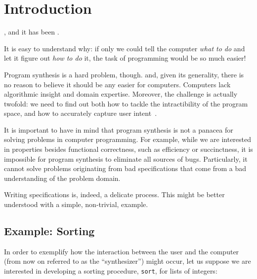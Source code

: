 \chapter{Introduction}
\label{chapter:introduction}

 , and it has been
.

It is easy to understand why: if only we could tell the computer \textit{what to
do} and let it figure out \textit{how to do} it, the task of programming would
be so much easier!

Program synthesis is a hard problem, though.  and, given its generality,
there is no reason to believe it should be any easier for computers. Computers
lack algorithmic insight and domain expertise. Moreover, the challenge is
actually twofold: we need to find out both how to tackle the intractibility of
the program space, and how to accurately capture user intent~\cite{Gulwani2017}.


It is important to have in mind that program synthesis is not a panacea for
solving problems in computer programming. For example, while we are interested
in properties besides functional correctness, such as efficiency or
succinctness, it is impossible for program synthesis to eliminate all sources of
bugs. Particularly, it cannot solve problems originating from bad specifications
that come from a bad understanding of the problem domain.

Writing specifications is, indeed, a delicate process. This might be better
understood with a simple, non-trivial, example.

\section{Example: Sorting}
\label{sec:sorting-example}

In order to exemplify how the interaction between the user and the computer
(from now on referred to as the ``synthesizer'') might occur, let us suppose we
are interested in developing a sorting procedure, \lstinline{sort}, for lists of
integers:


